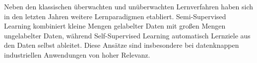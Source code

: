 Neben den klassischen überwachten und unüberwachten Lernverfahren haben sich in den letzten Jahren weitere Lernparadigmen etabliert. Semi-Supervised Learning kombiniert kleine Mengen gelabelter Daten mit großen Mengen ungelabelter Daten, während Self-Supervised Learning automatisch Lernziele aus den Daten selbst ableitet. Diese Ansätze sind insbesondere bei datenknappen industriellen Anwendungen von hoher Relevanz. \cite{zhu2005semi}  \cite{gui2024survey}



	
	
	
	
